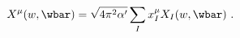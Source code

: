 \begin{equation}\label{eq:modes}
  X^\mu (w,\wbar ) = \sqrt{4\pi^2\alpha'}\sum_I x^\mu_I X_I(w,\wbar )\ .
\end{equation}

